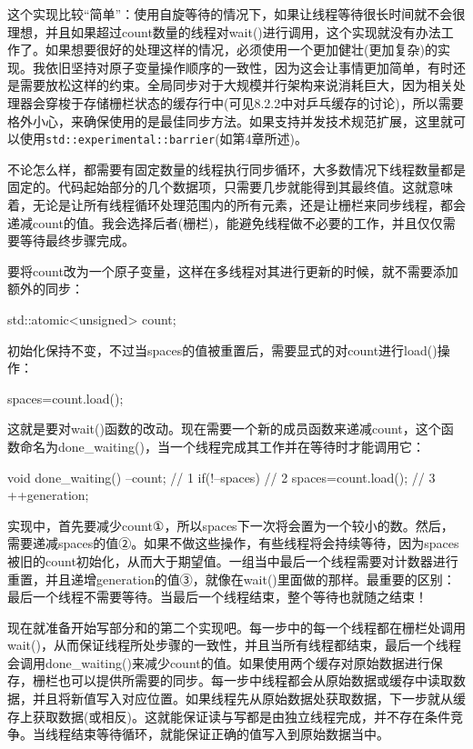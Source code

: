 这个实现比较“简单”：使用自旋等待的情况下，如果让线程等待很长时间就不会很理想，并且如果超过count数量的线程对wait()进行调用，这个实现就没有办法工作了。如果想要很好的处理这样的情况，必须使用一个更加健壮(更加复杂)的实现。我依旧坚持对原子变量操作顺序的一致性，因为这会让事情更加简单，有时还是需要放松这样的约束。全局同步对于大规模并行架构来说消耗巨大，因为相关处理器会穿梭于存储栅栏状态的缓存行中(可见8.2.2中对乒乓缓存的讨论)，所以需要格外小心，来确保使用的是最佳同步方法。如果支持并发技术规范扩展，这里就可以使用\texttt{std::experimental::barrier}(如第4章所述)。

不论怎么样，都需要有固定数量的线程执行同步循环，大多数情况下线程数量都是固定的。代码起始部分的几个数据项，只需要几步就能得到其最终值。这就意味着，无论是让所有线程循环处理范围内的所有元素，还是让栅栏来同步线程，都会递减count的值。我会选择后者(栅栏)，能避免线程做不必要的工作，并且仅仅需要等待最终步骤完成。

要将count改为一个原子变量，这样在多线程对其进行更新的时候，就不需要添加额外的同步：

\begin{cpp}
std::atomic<unsigned> count;
\end{cpp}

初始化保持不变，不过当spaces的值被重置后，需要显式的对count进行load()操作：

\begin{cpp}
spaces=count.load();
\end{cpp}

这就是要对wait()函数的改动。现在需要一个新的成员函数来递减count，这个函数命名为done\_waiting()，当一个线程完成其工作并在等待时才能调用它：

\begin{cpp}
void done_waiting()
{
  --count;  // 1
  if(!--spaces)  // 2
  {
    spaces=count.load();  // 3
    ++generation;
  }
}
\end{cpp}

实现中，首先要减少count①，所以spaces下一次将会置为一个较小的数。然后，需要递减spaces的值②。如果不做这些操作，有些线程将会持续等待，因为spaces被旧的count初始化，从而大于期望值。一组当中最后一个线程需要对计数器进行重置，并且递增generation的值③，就像在wait()里面做的那样。最重要的区别：最后一个线程不需要等待。当最后一个线程结束，整个等待也就随之结束！

现在就准备开始写部分和的第二个实现吧。每一步中的每一个线程都在栅栏处调用wait()，从而保证线程所处步骤的一致性，并且当所有线程都结束，最后一个线程会调用done\_waiting()来减少count的值。如果使用两个缓存对原始数据进行保存，栅栏也可以提供所需要的同步。每一步中线程都会从原始数据或缓存中读取数据，并且将新值写入对应位置。如果线程先从原始数据处获取数据，下一步就从缓存上获取数据(或相反)。这就能保证读与写都是由独立线程完成，并不存在条件竞争。当线程结束等待循环，就能保证正确的值写入到原始数据当中。

